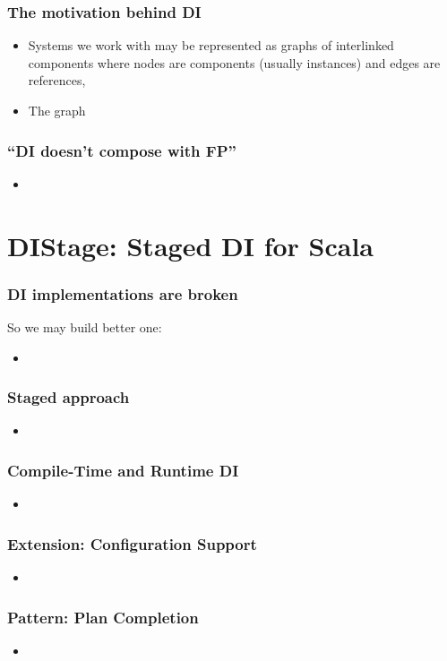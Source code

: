 \documentclass[usenames,dvipsnames]{beamer}
\begin{document}
\begin{frame}
\frametitle{The motivation behind DI}
\begin{itemize}
\item Systems we work with may be represented as graphs of interlinked components where nodes are components (usually instances) and edges are references,
\item The graph 
\end{itemize}
\end{frame}

\begin{frame}
\frametitle{``DI doesn't compose with FP''}
\begin{itemize}
\item 
\end{itemize}
\end{frame}

\section{DIStage: Staged DI for Scala}

\begin{frame}
\frametitle{DI implementations are broken}
So we may build better one:
\begin{itemize}
\item 
\end{itemize}
\end{frame}

\begin{frame}
\frametitle{Staged approach}
\begin{itemize}
\item 
\end{itemize}
\end{frame}

\begin{frame}
\frametitle{Compile-Time and Runtime DI}
\begin{itemize}
\item 
\end{itemize}
\end{frame}

\begin{frame}
\frametitle{Extension: Configuration Support}
\begin{itemize}
\item 
\end{itemize}
\end{frame}

\begin{frame}
\frametitle{Pattern: Plan Completion}
\begin{itemize}
\item 
\end{itemize}
\end{frame}
\end{document}
